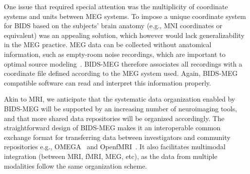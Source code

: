 One issue that required special attention was the multiplicity of coordinate systems and units between MEG systems. To impose a unique coordinate system for BIDS based on the subjects’ brain anatomy (e.g., MNI coordinates or equivalent) was an appealing solution, which however would lack generalizability in the MEG practice. MEG data can be collected without anatomical information, such as empty-room noise recordings, which are important to optimal source modeling~\citep{gross-etal:13}. BIDS-MEG therefore associates all recordings with a coordinate file defined according to the MEG system used. Again, BIDS-MEG compatible software can read and interpret this information properly.

Akin to MRI, we anticipate that the systematic data organization enabled by BIDS-MEG will be supported by an increasing number of neuroimaging tools, and that more shared data repositories will be organized accordingly. The straightforward design of BIDS-MEG makes it an interoperable common exchange format for transferring data between investigators and community repositories e.g., OMEGA~\citep{niso2016omega} and OpenfMRI~\citep{poldrack2017openfmri}. It also facilitates multimodal integration (between MRI, fMRI, MEG, etc), as the data from multiple modalities follow the same organization scheme.
